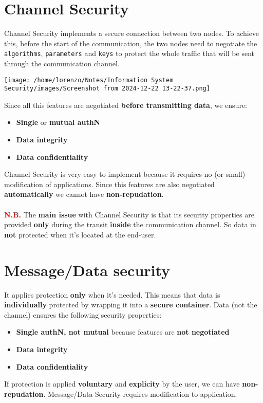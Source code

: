 \section{Channel Security}
\begin{minipage}{0.7\textwidth}
Channel Security implements a secure connection between two nodes. To achieve this, before the start of the communication, the two nodes need to negotiate the \texttt{algorithms}, \texttt{parameters} and \texttt{keys} to protect the whole traffic that will be sent through the communication channel.
\end{minipage} 
\hspace{0.5cm}
\begin{minipage}{0.3\textwidth}
    \centering
    \texttt{[image: /home/lorenzo/Notes/Information System Security/images/Screenshot from 2024-12-22 13-22-37.png]}
\end{minipage}
\noindent
Since all this features are negotiated \textbf{before transmitting data}, we ensure:
\begin{itemize}
    \item \textbf{Single} or \textbf{mutual authN}
    \item \textbf{Data integrity}
    \item \textbf{Data confidentiality}
\end{itemize}
Channel Security is very easy to implement because it requires no (or small) modification of applications. Since this features are also negotiated \textbf{automatically} we cannot have \textbf{non-repudation}.\\
\\
\textcolor{red}{\textbf{N.B.}} The \textbf{main issue} with Channel Security is that its security properties are provided \textbf{only} during the transit \textbf{inside} the communication channel. So data in \textbf{not} protected when it's located at the end-user. 

\section{Message/Data security}
It applies protection \textbf{only} when it's needed. This means that data is \textbf{individually} protected by wrapping it into a \textbf{secure container}. Data (not the channel) ensures the following security properties:
\begin{itemize}
    \item \textbf{Single authN, not mutual} because features are \textbf{not negotiated}
    \item \textbf{Data integrity}
    \item \textbf{Data confidentiality}
    
\end{itemize}
If protection is applied \textbf{voluntary} and \textbf{explicity} by the user, we can have \textbf{non-repudation}. Message/Data Security requires modification to application.